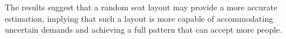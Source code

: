 The results suggest that a random seat layout may provide a more accurate estimation, implying that such a layout is more capable of accommodating uncertain demands and achieving a full pattern that can accept more people.






\newpage






